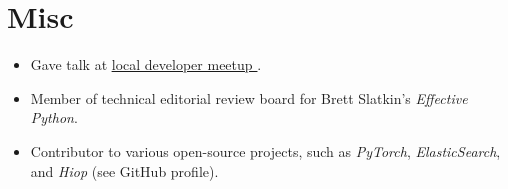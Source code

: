\documentclass{mycv}
\begin{document}
\section{Misc}

\begin{itemize}
  \item Gave talk at \href{https://fullstacktc.org/user/ashermancinelli}{ \underline{ local developer meetup } }. 
  \item Member of technical editorial review board for Brett Slatkin's \textit{Effective Python}. 
  \item Contributor to various open-source projects, such as \textit{PyTorch}, \textit{ElasticSearch}, and \textit{Hiop} (see GitHub profile).
\end{itemize}
% 

%
\end{document}
